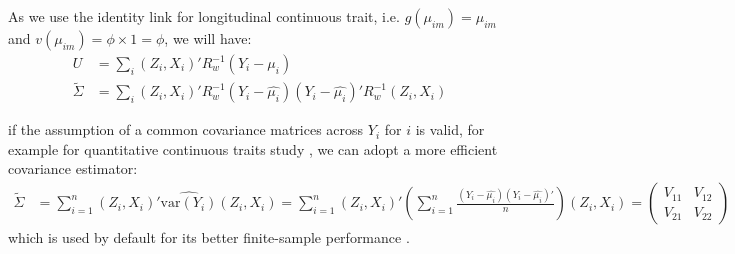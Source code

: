 \documentclass[12pt]{article}
\begin{document}
\indent As we use the identity link for longitudinal continuous trait, i.e. $g(\mu_{im}) = \mu_{im}$ and $v(\mu_{im}) = \phi \times 1 = \phi$, we will have:
\begin{align}
U & = \sum_{i}\left(Z_{i},X_{i}\right)' R_w^{-1} (Y_{i}-\mu_{i}) \nonumber\\
\widetilde{\Sigma} & = \sum_{i}\left(Z_{i},X_{i}\right)' R_w^{-1} (Y_{i}-\hat{\mu_{i}})(Y_{i}-\hat{\mu_{i}})' R_w^{-1} \left(Z_{i},X_{i}\right)
\label{eq:2}
\end{align}

if the assumption of a common covariance matrices across $Y_i$ for $i$ is valid, for example for quantitative continuous traits study \cite{pan2001robust}, we can adopt a more efficient covariance estimator:
\begin{align*}
\widetilde{\Sigma} & = \sum_{i=1}^n \left(Z_{i},X_{i}\right)'\widehat{\textrm{var}(Y_{i})}\left(Z_{i},X_{i}\right)
 = \sum_{i=1}^n \left(Z_{i},X_{i}\right)'\left(\sum_{i=1}^n \frac{(Y_{i}-\hat{\mu_{i}})(Y_{i}-\hat{\mu_{i}})'}{n}\right)\left(Z_{i},X_{i}\right) = 
\begin{pmatrix}
V_{11} & V_{12}\\
 V_{21} & V_{22}
\end{pmatrix}
\end{align*}
which is used by default for its better finite-sample performance \cite{pan2001robust}.

\end{document}
